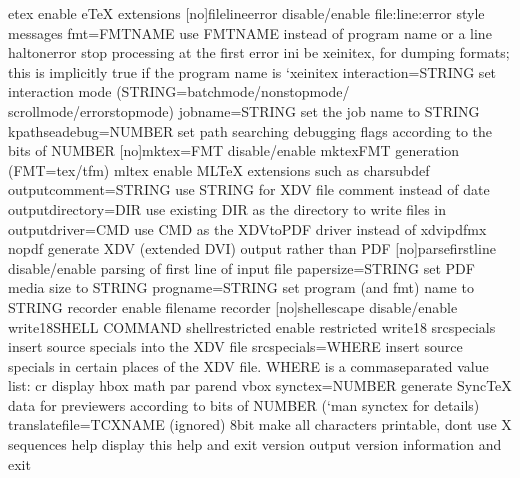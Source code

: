\documentclass[letterpaper,12pt,english]{sphinxmanual}
\begin{document}
\begin{sphinxVerbatim}[commandchars=\\\{\}]
\PYGZhy{}etex                   enable e\PYGZhy{}TeX extensions
[\PYGZhy{}no]\PYGZhy{}file\PYGZhy{}line\PYGZhy{}error   disable/enable file:line:error style messages
\PYGZhy{}fmt=FMTNAME            use FMTNAME instead of program name or a \PYGZpc{}\PYGZam{} line
\PYGZhy{}halt\PYGZhy{}on\PYGZhy{}error          stop processing at the first error
\PYGZhy{}ini                    be xeinitex, for dumping formats; this is implicitly
                          true if the program name is `xeinitex\PYGZsq{}
\PYGZhy{}interaction=STRING     set interaction mode (STRING=batchmode/nonstopmode/
                          scrollmode/errorstopmode)
\PYGZhy{}jobname=STRING         set the job name to STRING
\PYGZhy{}kpathsea\PYGZhy{}debug=NUMBER  set path searching debugging flags according to
                          the bits of NUMBER
[\PYGZhy{}no]\PYGZhy{}mktex=FMT         disable/enable mktexFMT generation (FMT=tex/tfm)
\PYGZhy{}mltex                  enable MLTeX extensions such as \PYGZbs{}charsubdef
\PYGZhy{}output\PYGZhy{}comment=STRING  use STRING for XDV file comment instead of date
\PYGZhy{}output\PYGZhy{}directory=DIR   use existing DIR as the directory to write files in
\PYGZhy{}output\PYGZhy{}driver=CMD      use CMD as the XDV\PYGZhy{}to\PYGZhy{}PDF driver instead of xdvipdfmx
\PYGZhy{}no\PYGZhy{}pdf                 generate XDV (extended DVI) output rather than PDF
[\PYGZhy{}no]\PYGZhy{}parse\PYGZhy{}first\PYGZhy{}line  disable/enable parsing of first line of input file
\PYGZhy{}papersize=STRING       set PDF media size to STRING
\PYGZhy{}progname=STRING        set program (and fmt) name to STRING
\PYGZhy{}recorder               enable filename recorder
[\PYGZhy{}no]\PYGZhy{}shell\PYGZhy{}escape      disable/enable \PYGZbs{}write18\PYGZob{}SHELL COMMAND\PYGZcb{}
\PYGZhy{}shell\PYGZhy{}restricted       enable restricted \PYGZbs{}write18
\PYGZhy{}src\PYGZhy{}specials           insert source specials into the XDV file
\PYGZhy{}src\PYGZhy{}specials=WHERE     insert source specials in certain places of
                          the XDV file. WHERE is a comma\PYGZhy{}separated value
                          list: cr display hbox math par parend vbox
\PYGZhy{}synctex=NUMBER         generate SyncTeX data for previewers according to
                          bits of NUMBER (`man synctex\PYGZsq{} for details)
\PYGZhy{}translate\PYGZhy{}file=TCXNAME (ignored)
\PYGZhy{}8bit                   make all characters printable, don\PYGZsq{}t use \PYGZca{}\PYGZca{}X sequences
\PYGZhy{}help                   display this help and exit
\PYGZhy{}version                output version information and exit
\end{sphinxVerbatim}
\end{document}
